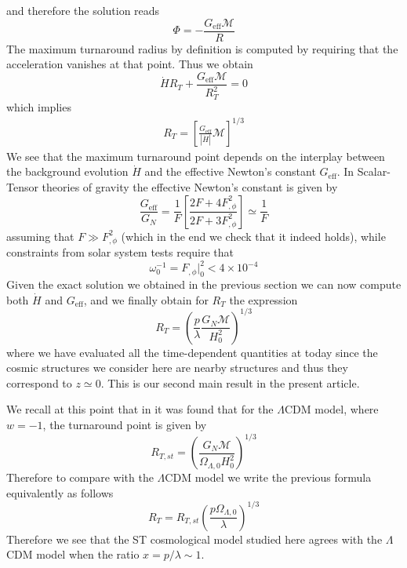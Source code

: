 and therefore the solution reads
\begin{equation}
\Phi = - \frac{G_{\text{eff}} \mathcal{M}}{R}
\end{equation}
The maximum turnaround radius by definition is computed by requiring that the acceleration vanishes at that point. Thus we obtain \cite{kousvos}
\begin{equation}
\dot{H} R_T + \frac{G_{\text{eff}} \mathcal{M}}{R_T^2} = 0
\end{equation}
which implies
\begin{align}
R_T = \left[\frac{G_{\text{eff}}}{|\dot{H}|}\mathcal{M}\right]^{1/3}
\end{align}
We see that the maximum turnaround point depends on the interplay between the background evolution $\dot{H}$ and the effective Newton's constant $G_{\text{eff}}$. 
%
In Scalar-Tensor theories of gravity the effective Newton's constant is given by \cite{leandros1,leandros2}
\begin{equation}
\frac{G_{\text{eff}}}{G_N} = \frac{1}{F} \left[ \frac{2F + 4 F_{,\phi}^2}{2F + 3 F_{,\phi}^2} \right] \simeq \frac{1}{F}
\end{equation}
assuming that $F \gg F_{,\phi}^2$ (which in the end we check that it indeed holds), while constraints from solar system tests require that \cite{leandros1}
\begin{equation}
\omega_0^{-1} = F_{,\phi}|_0^2 < 4 \times 10^{-4}
\end{equation}
Given the exact solution we obtained in the previous section we can now compute both $\dot{H}$ and $G_{\text{eff}}$, and we finally obtain for $R_T$ the expression
\begin{equation}
R_T = \left ( \frac{p}{\lambda} \frac{G_N \mathcal{M}}{H_0^2}  \right)^{1/3}
\end{equation}
where we have evaluated all the time-dependent quantities at today since the cosmic structures we consider here are nearby structures and thus they correspond to $z \simeq 0$. This is our second main result in the present article.

We recall at this point that in \cite{tomaras1,tomaras2} it was found that for the $\Lambda$CDM model, where $w=-1$, the turnaround point is given by
\begin{equation}
R_{T,st} = \left ( \frac{G_N \mathcal{M}}{\Omega_{\Lambda,0} H_0^2}  \right)^{1/3}
\end{equation}
Therefore to compare with the $\Lambda$CDM model we write the previous formula equivalently as follows
\begin{equation}
R_{T} = R_{T,st} \left ( \frac{p \Omega_{\Lambda,0}}{\lambda} \right)^{1/3}
\end{equation}
Therefore we see that the ST cosmological model studied here agrees with the $\Lambda$CDM model when the ratio $x = p/\lambda \sim 1$. 

